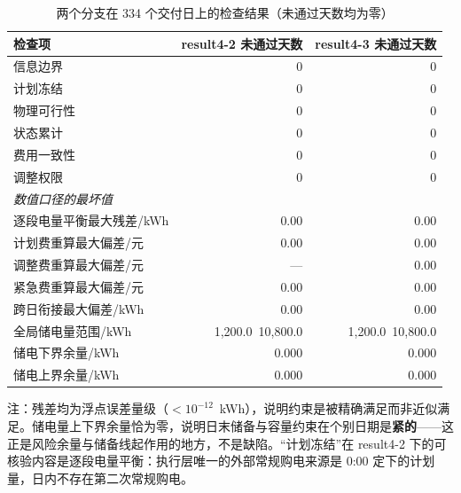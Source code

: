\begin{table}[htbp]
  \centering
  \caption{两个分支在 334 个交付日上的检查结果（未通过天数均为零）}
  \label{tab:p4-check}
  \footnotesize
  \begin{tabular}{lrr}
    \toprule
    检查项 & result4-2 未通过天数 & result4-3 未通过天数 \\
    \midrule
    信息边界 & 0 & 0 \\
    计划冻结 & 0 & 0 \\
    物理可行性 & 0 & 0 \\
    状态累计 & 0 & 0 \\
    费用一致性 & 0 & 0 \\
    调整权限 & 0 & 0 \\
    \midrule
    \multicolumn{3}{l}{\textit{数值口径的最坏值}} \\
    \midrule
    逐段电量平衡最大残差/kWh & $0.00$ & $0.00$ \\
    计划费重算最大偏差/元 & $0.00$ & $0.00$ \\
    调整费重算最大偏差/元 & --- & $0.00$ \\
    紧急费重算最大偏差/元 & $0.00$ & $0.00$ \\
    跨日衔接最大偏差/kWh & $0.00$ & $0.00$ \\
    全局储电量范围/kWh & 1,200.0~10,800.0 & 1,200.0~10,800.0 \\
    \midrule
    储电下界余量/kWh & 0.000 & 0.000 \\
    储电上界余量/kWh & 0.000 & 0.000 \\
    \bottomrule
  \end{tabular}
  \par\vspace{2pt}
  \begin{minipage}{.92\textwidth}\footnotesize
    注：残差均为浮点误差量级（$<10^{-12}$~kWh），说明约束是被精确满足而非近似满足。储电量上下界余量恰为零，说明日末储备与容量约束在个别日期是\textbf{紧的}——这正是风险余量与储备线起作用的地方，不是缺陷。``计划冻结''在 result4-2 下的可核验内容是逐段电量平衡：执行层唯一的外部常规购电来源是 0:00 定下的计划量，日内不存在第二次常规购电。
  \end{minipage}
\end{table}
